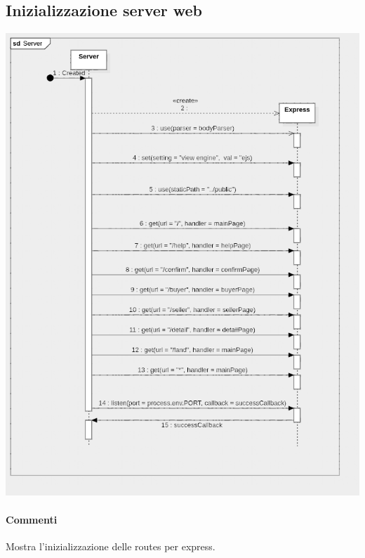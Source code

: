 \documentclass[a4paper, 12pt]{article}
\begin{document}
\subsection{Inizializzazione server web}
\includegraphics[width=1.0\textwidth]{server}
\paragraph{Commenti}
Mostra l'inizializzazione delle routes per express.
\end{document}
